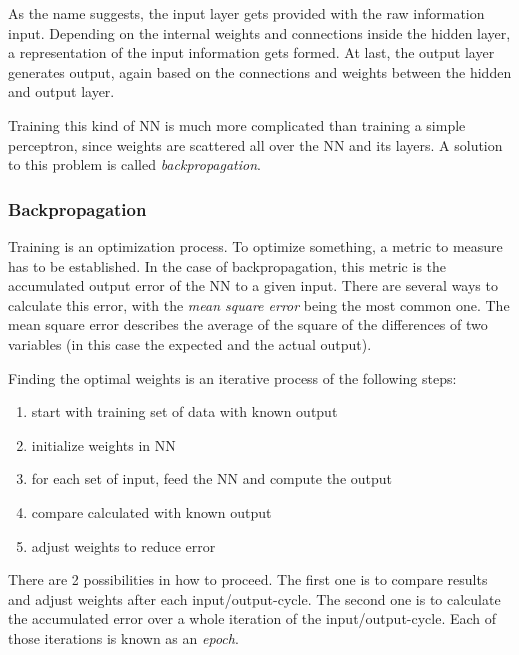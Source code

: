 As the name suggests, the input layer gets provided with the raw information input. Depending on the internal weights and connections inside the hidden layer, a representation of the input information gets formed. At last, the output layer generates output, again based on the connections and weights between the hidden and output layer\cite{Stergiou96}.

Training this kind of NN is much more complicated than training a simple perceptron, since weights are scattered all over the NN and its layers. A solution to this problem is called \emph{backpropagation}\cite{Shiffman12}.


\subsubsection{Backpropagation}
Training is an optimization process. To optimize something, a metric to measure has to be established. In the case of backpropagation, this metric is the accumulated output error of the NN to a given input. There are several ways to calculate this error, with the \emph{mean square error} being the most common one\cite{Bourg04}. The mean square error describes the average of the square of the differences of two variables (in this case the expected and the actual output). 

Finding the optimal weights is an iterative process of the following steps:
\begin{enumerate}
	\item start with training set of data with known output
	\item initialize weights in NN
	\item for each set of input, feed the NN and compute the output
	\item compare calculated with known output
	\item adjust weights to reduce error
\end{enumerate}

There are 2 possibilities in how to proceed. The first one is to compare results and adjust weights after each input/output-cycle. The second one is to calculate the accumulated error over a whole iteration of the input/output-cycle. Each of those iterations is known as an \emph{epoch}\cite{Bourg04}.


